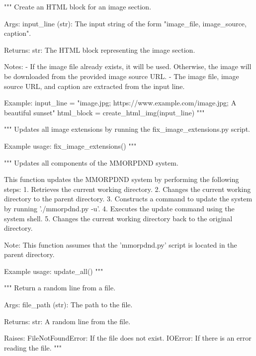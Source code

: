 \begin{codebox}
"""
Create an HTML block for an image section.

Args:
    input_line (str): The input string of the form "image_file, image_source, caption".

Returns:
    str: The HTML block representing the image section.

Notes:
    - If the image file already exists, it will be used. Otherwise, the image will be downloaded from the provided image source URL.
    - The image file, image source URL, and caption are extracted from the input line.

Example:
    input_line = "image.jpg; https://www.example.com/image.jpg; A beautiful sunset"
    html_block = create_html_img(input_line)
"""
\end{codebox}

\begin{codebox}
"""
Updates all image extensions by running the fix_image_extensions.py script.

Example usage:
   	fix_image_extensions()
"""
\end{codebox}

\begin{codebox}
"""
Updates all components of the MMORPDND system.

This function updates the MMORPDND system by performing the following steps:
	1. Retrieves the current working directory.
	2. Changes the current working directory to the parent directory.
	3. Constructs a command to update the system by running './mmorpdnd.py -u'.
	4. Executes the update command using the system shell.
	5. Changes the current working directory back to the original directory.

Note: This function assumes that the 'mmorpdnd.py' script is located in the parent directory.

Example usage:
	update_all()
"""
\end{codebox}

\begin{codebox}
"""
Return a random line from a file.

Args:
    file_path (str): The path to the file.

Returns:
    str: A random line from the file.

Raises:
    FileNotFoundError: If the file does not exist.
    IOError: If there is an error reading the file.
"""
\end{codebox}

